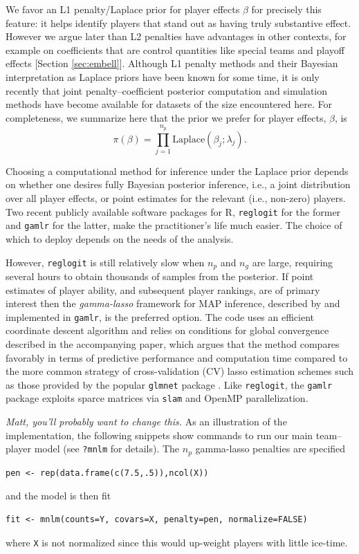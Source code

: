 We favor an L1 penalty/Laplace prior for player effects $\beta$ for precisely
this feature: it helps identify players that stand out as having truly
substantive effect.  However we argue later than L2 penalties have advantages
in other contexts, for example on coefficients that are control quantities
like special teams and playoff effects [Section \ref{sec:embell}]. Although L1
penalty methods and their Bayesian interpretation as Laplace priors have been
known for some time, it is only recently that joint penalty--coefficient
posterior computation and simulation methods have become available for
datasets of the size encountered here.  For completeness, we summarize here
that the prior we prefer for player effects, $\beta$, is
\begin{equation}
\pi(\beta) = \prod_{j=1}^{n_p} \mathrm{Laplace}(\beta_j; \lambda_j).
\end{equation}

Choosing a computational method for inference under the Laplace prior depends
on whether one desires fully Bayesian posterior inference, i.e., a joint
distribution over all player effects, or point estimates for the relevant
(i.e., non-zero) players.  Two recent publicly available software packages
for {\sf R}, {\tt reglogit} \cite{reglogit} for the former and {\tt gamlr}
\cite{gamlr} for the latter, make the practitioner's life much easier. The
choice of which to deploy depends on the needs of the analysis. 



However, {\tt reglogit} is still relatively slow when $n_p$ and $n_g$ are
large, requiring several hours to obtain thousands of samples from the
posterior.  If point estimates of player ability, and subsequent player
rankings, are of primary interest then the {\em gamma-lasso} framework for MAP
inference, described by \cite{taddy:2012} and implemented in {\tt gamlr}, is
the preferred option. The code uses an efficient coordinate descent algorithm
and relies on conditions for global convergence described in the accompanying
paper, which argues that the method compares favorably in terms of predictive
performance and computation time compared to the more common strategy of
cross-validation (CV) lasso estimation schemes such as those provided by the
popular {\tt glmnet} package
\cite{glmnet}.  Like {\tt reglogit}, the {\tt gamlr} package exploits sparce
matrices via {\tt slam} and OpenMP parallelization.

{\em Matt, you'll probably want to change this.}  As an illustration of the
implementation, the following snippets show commands to run our main
team--player model (see \verb!?mnlm! for details).  
The $n_p$ gamma-lasso penalties are specified 
\begin{verbatim}
pen <- rep(data.frame(c(7.5,.5)),ncol(X))
\end{verbatim}
and the model is then fit
\begin{verbatim}
fit <- mnlm(counts=Y, covars=X, penalty=pen, normalize=FALSE)
\end{verbatim}
where \verb!X! is not normalized since this would up-weight players with little ice-time.

